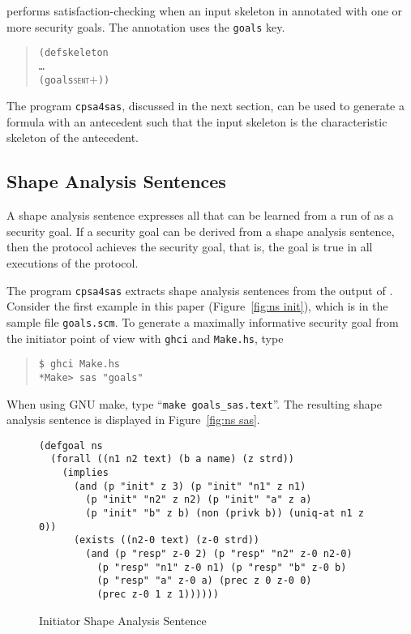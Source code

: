 {\cpsa} performs satisfaction-checking when an input skeleton in annotated
with one or more security goals.  The annotation uses the
\texttt{goals} key.

\begin{quote}
  \begin{alltt}
(defskeleton
   \ldots
   (goals \textsc{sent\ensuremath{+}}))
  \end{alltt}
\end{quote}

The program \texttt{cpsa4sas}, discussed in the next section, can be
used to generate a formula with an antecedent such that the input
skeleton is the characteristic skeleton of the antecedent.

\subsection{Shape Analysis Sentences}\label{sec:sas}

A shape analysis sentence expresses all that can be learned from a run
of {\cpsa} as a security goal.  If a security goal can be derived from
a shape analysis sentence, then the protocol achieves the security
goal, that is, the goal is true in all executions of the protocol.

The program \texttt{cpsa4sas} extracts shape analysis sentences from
the output of {\cpsa}.  Consider the first example in this paper
(Figure~\ref{fig:ns init}), which is in the sample file
\texttt{goals.scm}.  To generate a maximally informative security goal
from the initiator point of view with \texttt{ghci} and
\texttt{Make.hs}, type
\begin{quote}
\begin{verbatim}
$ ghci Make.hs
*Make> sas "goals"
\end{verbatim}
\end{quote}
When using GNU make, type ``\texttt{make goals\_sas.text}''.  The
resulting shape analysis sentence is displayed in Figure~\ref{fig:ns
  sas}.

\begin{figure}\small
\begin{verbatim}
(defgoal ns
  (forall ((n1 n2 text) (b a name) (z strd))
    (implies
      (and (p "init" z 3) (p "init" "n1" z n1)
        (p "init" "n2" z n2) (p "init" "a" z a)
        (p "init" "b" z b) (non (privk b)) (uniq-at n1 z 0))
      (exists ((n2-0 text) (z-0 strd))
        (and (p "resp" z-0 2) (p "resp" "n2" z-0 n2-0)
          (p "resp" "n1" z-0 n1) (p "resp" "b" z-0 b)
          (p "resp" "a" z-0 a) (prec z 0 z-0 0)
          (prec z-0 1 z 1))))))
\end{verbatim}
\caption{Initiator Shape Analysis Sentence}\label{fig:ns sas}
\end{figure}

